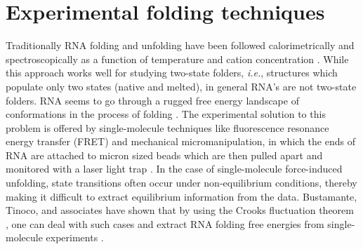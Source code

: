 \section{Experimental folding techniques}
Traditionally   RNA   folding  and   unfolding   have  been   followed
calorimetrically  and spectroscopically as  a function  of temperature
and cation concentration  \cite{bloomfield2000, boots2008}. While this
approach  works well  for studying  two-state  folders, \textit{i.e.},
structures  which populate  only two  states (native  and  melted), in
general RNA's  are not  two-state folders. RNA  seems to go  through a
rugged  free  energy landscape  of  conformations  in  the process  of
folding \cite{zhuang2003}.  The  experimental solution to this problem
is offered  by single-molecule techniques  like fluorescence resonance
energy transfer (FRET) and  mechanical micromanipulation, in which the
ends of RNA  are attached to micron sized beads  which are then pulled
apart  and  monitored  with  a laser  light  trap  \cite{liphardt2001,
  onoa2004,  tinoco2004, hyeon2005}.  In  the case  of single-molecule
force-induced   unfolding,  state   transitions   often  occur   under
non-equilibrium  conditions, thereby  making it  difficult  to extract
equilibrium  information from the  data. Bustamante, Tinoco,
and associates have shown that by using the Crooks fluctuation theorem
\cite{crooks1999},  one  can deal  with  such  cases  and extract  RNA
folding    free     energies    from    single-molecule    experiments
\cite{collin2005}. %



